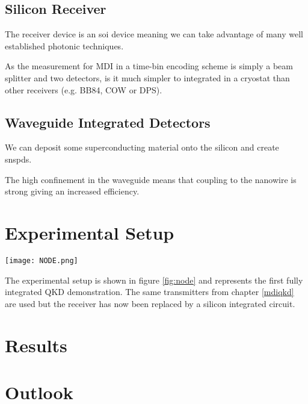 \subsection{Silicon Receiver}

The receiver device is an \ac{soi} device meaning we can take advantage of many well established photonic techniques.

As the measurement for \ac{MDI} in a time-bin encoding scheme is simply a beam splitter and two detectors, is it much simpler to integrated in a cryostat than other receivers (e.g. BB84, COW or DPS).

\subsection{Waveguide Integrated Detectors}

We can deposit some superconducting material onto the silicon and create \acp{snspd}. 

The high confinement in the waveguide means that coupling to the nanowire is strong giving an increased efficiency. 

\section{Experimental Setup}

\begin{sidewaysfigure}
	\centering
	\texttt{[image: NODE.png]}
	\caption[Fully integrated QKD setup]{Experimental setup for fully integrated quantum key distribution. Alice and Bob use independent InP devices which generate BB84 states on-chip. The receiver (Charlie) is an SOI device with grating couplers and waveguide-integrated detectors.}
	\label{fig:node}
\end{sidewaysfigure}

The experimental setup is shown in figure \ref{fig:node} and represents the first fully integrated \ac{QKD} demonstration. The same transmitters from chapter \ref{mdiqkd} are used but the receiver has now been replaced by a silicon integrated circuit. 

\section{Results}



\section{Outlook}

